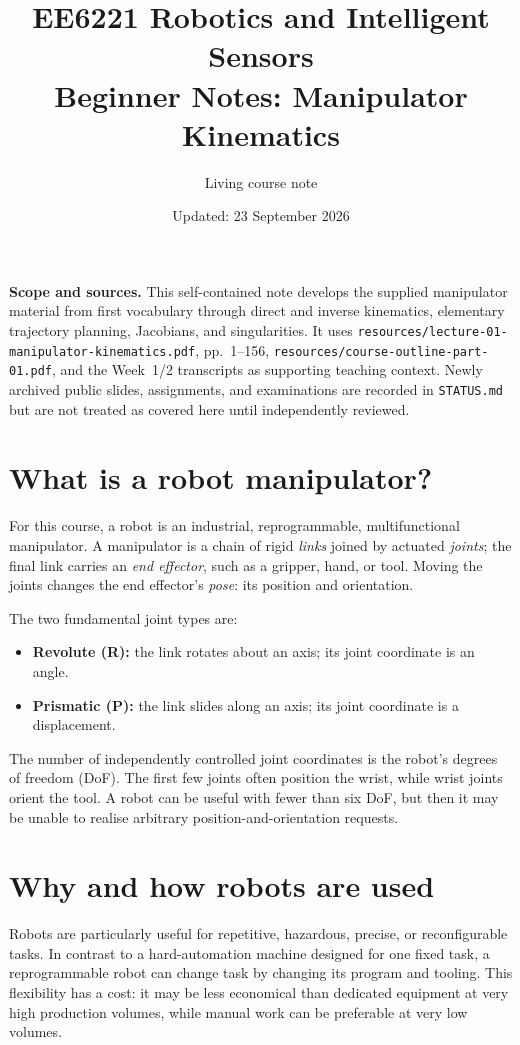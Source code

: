 \documentclass[11pt,a4paper]{article}
\title{EE6221 Robotics and Intelligent Sensors\\\large Beginner Notes: Manipulator Kinematics}
\author{Living course note}
\date{Updated: 23 September 2026}
\renewcommand{\texttt}[1]{\nolinkurl{#1}}
\begin{document}
\maketitle
\noindent\textbf{Scope and sources.} This self-contained note develops the supplied manipulator material from first vocabulary through direct and inverse kinematics, elementary trajectory planning, Jacobians, and singularities. It uses \texttt{resources/lecture-01-manipulator-kinematics.pdf}, pp.~1--156, \texttt{resources/course-outline-part-01.pdf}, and the Week~1/2 transcripts as supporting teaching context. Newly archived public slides, assignments, and examinations are recorded in \texttt{STATUS.md} but are not treated as covered here until independently reviewed.
\tableofcontents

\section{\enspace What is a robot manipulator?}
For this course, a robot is an industrial, reprogrammable, multifunctional manipulator. A manipulator is a chain of rigid \emph{links} joined by actuated \emph{joints}; the final link carries an \emph{end effector}, such as a gripper, hand, or tool. Moving the joints changes the end effector's \emph{pose}: its position and orientation.

The two fundamental joint types are:
\begin{itemize}
\item \textbf{Revolute (R):} the link rotates about an axis; its joint coordinate is an angle.
\item \textbf{Prismatic (P):} the link slides along an axis; its joint coordinate is a displacement.
\end{itemize}
The number of independently controlled joint coordinates is the robot's degrees of freedom (DoF). The first few joints often position the wrist, while wrist joints orient the tool. A robot can be useful with fewer than six DoF, but then it may be unable to realise arbitrary position-and-orientation requests.

\section{\enspace Why and how robots are used}
Robots are particularly useful for repetitive, hazardous, precise, or reconfigurable tasks. In contrast to a hard-automation machine designed for one fixed task, a reprogrammable robot can change task by changing its program and tooling. This flexibility has a cost: it may be less economical than dedicated equipment at very high production volumes, while manual work can be preferable at very low volumes.
\end{document}
